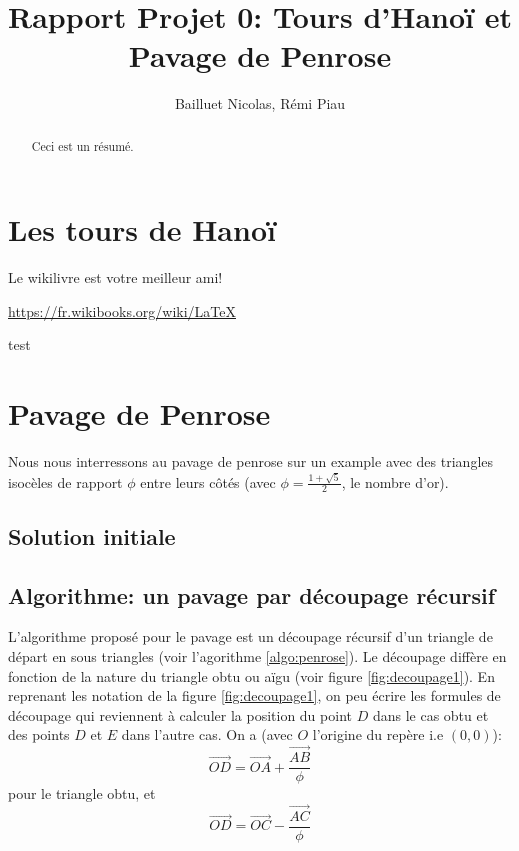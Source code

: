 \documentclass[a4paper,13pt]{article}
\begin{document}
\title{Rapport Projet 0: Tours d'Hanoï et Pavage de Penrose}

\author{Bailluet Nicolas, Rémi Piau}


\maketitle

\begin{abstract}
  Ceci est un résumé.
\end{abstract}


\section{Les tours de Hanoï}

Le wikilivre est votre meilleur ami!
\begin{center}
  \url{https://fr.wikibooks.org/wiki/LaTeX}
\end{center}

test


\section{Pavage de Penrose}

Nous nous interressons au pavage de penrose sur un example avec des triangles isocèles de rapport $\phi$ entre leurs côtés (avec $\phi = \frac{1 + \sqrt{5}}{2}$, le nombre d'or).

\subsection{Solution initiale}
\subsection{Algorithme: un pavage par découpage récursif}
L'algorithme proposé pour le pavage est un découpage récursif d'un triangle de départ en sous triangles (voir l'agorithme \ref{algo:penrose}). Le découpage diffère en fonction de la nature du triangle obtu ou aïgu (voir figure \ref{fig:decoupage1}).
En reprenant les notation de la figure \ref{fig:decoupage1}, on peu écrire les formules de découpage qui reviennent à calculer la position du point $D$ dans le cas obtu et des points $D$ et $E$ dans l'autre cas. On a (avec $O$ l'origine du repère i.e $(0,0)$):
\[ \vec{OD} = \vec{OA} + \frac{\vec{AB}}{\phi}\]
pour le triangle obtu, et
\[ \vec{OD} = \vec{OC} - \frac{\vec{AC}}{\phi}\]
\end{document}
